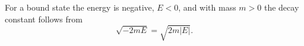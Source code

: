 \documentclass{article}
\begin{document}
For a bound state the energy is negative, $E<0$, and with mass $m>0$ the decay constant follows from
\begin{equation}
\sqrt{-2mE} = \sqrt{2m|E|} .
\label{eq:kappa}
\end{equation}
\end{document}

